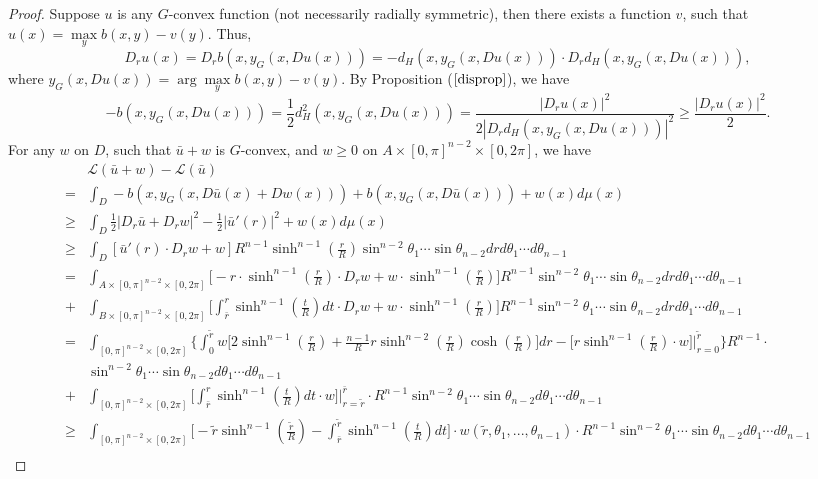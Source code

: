 \begin{proof}
	Suppose $u$ is any $G$-convex function (not necessarily radially symmetric), then there exists a function $v$, such that $u(x)=\max\limits_{y} b(x,y)-v(y)$. Thus, 
	$$D_ru(x) = D_rb(x,y_G(x,Du(x))) = -d_H(x,y_G(x,Du(x)))\cdot D_rd_H(x,y_G(x,Du(x))),$$ 
	where $y_G(x, Du(x))=\arg\max\limits_{y} b(x,y)-v(y)$. By Proposition ($\ref{disprop}$), we have
	\begin{equation*}
	-b(x,y_G(x,Du(x))) = \frac{1}{2}d_H^2(x,y_G(x,Du(x))) =\frac{|D_r u(x)|^2}{2|D_rd_H(x,y_G(x,Du(x)))|^2} \ge \frac{|D_r u(x)|^2}{2}.  
	\end{equation*}
	For any $w$ on $D$, such that $\bar{u}+w$ is $G$-convex, and $w\ge 0$ on $A\times[0,\pi]^{n-2}\times[0, 2\pi]$, we have
	\begin{equation*}
	\begin{split}
	&\mathcal{L}(\bar{u}+w)-\mathcal{L}(\bar{u}) \\
	=&\int_D -b(x, y_G(x,D\bar{u}(x)+Dw(x)))+b(x,y_G(x, D\bar{u}(x)))+w(x)d\mu(x)\\
	\ge& \int_D\frac{1}{2}|D_r\bar{u}+D_rw|^2-\frac{1}{2}|\bar{u}'(r)|^2 +w(x) d\mu(x)\\
	\ge& \int_D [\bar{u}'(r)\cdot D_rw+w]R^{n-1}\sinh^{n-1}(\frac{r}{R})\sin^{n-2}\theta_1\cdots \sin\theta_{n-2} dr d\theta_1 \cdots d\theta_{n-1} \\
	=&\int_{A\times [0,\pi]^{n-2}\times[0,2\pi]} \Big[-r\cdot\sinh^{n-1}(\frac{r}{R})\cdot D_rw+w\cdot \sinh^{n-1}(\frac{r}{R})\Big]R^{n-1}\sin^{n-2}\theta_1\cdots \sin\theta_{n-2} dr d\theta_1 \cdots d\theta_{n-1}\\
	+&\int_{B\times [0,\pi]^{n-2}\times[0,2\pi]} \Big[\int_{\bar{r}}^r\sinh^{n-1}(\frac{t}{R}) dt\cdot D_rw+w\cdot \sinh^{n-1}(\frac{r}{R})\Big]R^{n-1}\sin^{n-2}\theta_1\cdots \sin\theta_{n-2} dr d\theta_1 \cdots d\theta_{n-1}\\
	=&\int_{ [0,\pi]^{n-2}\times[0,2\pi]} \Big\{\int_{0}^{\tilde{r}}w\Big[2\sinh^{n-1}(\frac{r}{R})+\frac{n-1}{R}r\sinh^{n-2}(\frac{r}{R})\cosh(\frac{r}{R})\Big] dr-\Big[r\sinh^{n-1}(\frac{r}{R})\cdot w\Big]\bigg|_{r=0}^{\tilde{r}}\Big\}R^{n-1}\cdot\\
	&\sin^{n-2}\theta_1\cdots \sin\theta_{n-2}  d\theta_1 \cdots d\theta_{n-1}\\
	+&\int_{ [0,\pi]^{n-2}\times[0,2\pi]} \Big[\int_{\bar{r}}^{r}\sinh^{n-1}(\frac{t}{R})dt \cdot w\Big] \bigg|_{r=\tilde{r}}^{\bar{r}}\cdot R^{n-1}\sin^{n-2}\theta_1\cdots \sin\theta_{n-2} d\theta_1 \cdots d\theta_{n-1}\\
	\ge &\int_{[0,\pi]^{n-2}\times [0, 2\pi]}\Big[-\tilde{r}\sinh^{n-1}(\frac{\tilde{r}}{R}) -\int_{\bar{r}}^{\tilde{r}}\sinh^{n-1}(\frac{t}{R})dt\Big] \cdot w(\tilde{r}, \theta_1,...,\theta_{n-1})\cdot R^{n-1}\sin^{n-2}\theta_1\cdots \sin\theta_{n-2} d\theta_1 \cdots d\theta_{n-1}\\

\end{split}
\end{equation*}
\end{proof}

